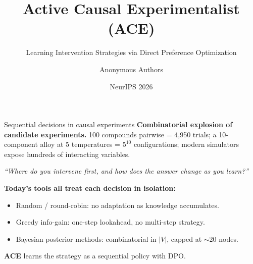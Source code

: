 \documentclass[aspectratio=169,10pt]{beamer}
\title{Active Causal Experimentalist (ACE)}
\subtitle{Learning Intervention Strategies via Direct Preference Optimization}
\date{NeurIPS 2026}
\author{Anonymous Authors}
\institute{\textit{Causal experimental design as a learnable policy}}
\begin{document}
\maketitle

\begin{frame}{Sequential decisions in causal experiments}
\textbf{Combinatorial explosion of candidate experiments.} 100 compounds pairwise =
4{,}950 trials; a 10-component alloy at 5 temperatures = $5^{10}$ configurations;
modern simulators expose hundreds of interacting variables.
\vspace{0.6em}

\centering
\emph{``Where do you intervene first, and how does the answer change as you learn?''}
\flushleft
\vspace{0.6em}

\textbf{Today's tools all treat each decision in isolation:}
\begin{itemize}
\item Random / round-robin: no adaptation as knowledge accumulates.
\item Greedy info-gain: one-step lookahead, no multi-step strategy.
\item Bayesian posterior methods: combinatorial in $|V|$, capped at $\sim$20 nodes.
\end{itemize}
\vspace{0.4em}

\textbf{ACE} learns the strategy as a sequential policy with DPO.
\end{frame}
\end{document}

